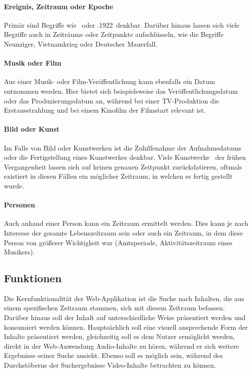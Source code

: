 \paragraph{Ereignis, Zeitraum oder Epoche}
Primär sind Begriffe wie \zB {}\grqq \ oder .1922\grqq \ denkbar. Darüber hinaus lassen sich viele Begriffe auch in Zeiträume oder Zeitpunkte aufschlüsseln, wie \zB die Begriffe \glqq Neunziger\grqq , \glqq Vietnamkrieg \grqq oder \glqq Deutscher Mauerfall\grqq . 

\paragraph{Musik oder Film}
Aus einer Musik- oder Film-Veröffentlichung kann ebenfalls ein Datum entnommen werden. Hier bietet sich beispielsweise das Veröffentlichungsdatum oder das Produzierungsdatum an, während bei einer TV-Produktion die Erstausstrahlung und bei einem Kinofilm der Filmstart relevant ist.

\paragraph{Bild oder Kunst}
Im Falle von Bild oder Kunstwerken ist die Zuhilfenahme der Aufnahmedatums oder die Fertigstellung eines Kunstwerkes denkbar. Viele Kunstwerke \oae \ der frühen Vergangenheit lassen sich auf keinen genauen Zeitpunkt zurückdatieren, oftmals existiert in diesen Fällen ein möglicher Zeitraum, in welchen es fertig gestellt wurde.

\paragraph{Personen}
Auch anhand einer Person kann ein Zeitraum ermittelt werden. Dies kann je nach Interesse der gesamte Lebenszeitraum sein oder auch ein Zeitraum, in dem diese Person von größerer Wichtigkeit war (Amtsperiode, Aktivitätszeitraum eines Musikers).

\subsection{Funktionen}
Die Kernfunktionalität der Web-Applikation ist die Suche nach Inhalten, die aus einem spezifischen Zeitraum stammen, \bzw sich mit diesem Zeitraum befassen. Darüber hinaus soll der Inhalt auf unterschiedliche Weise präsentiert werden und konsumiert werden können. Hauptsächlich soll eine visuell ansprechende Form der Inhalte präsentiert werden, gleichzeitig soll es dem Nutzer ermöglicht werden, direkt in der Web-Anwendung Audio-Inhalte zu hören, während er sich weitere Ergebnisse seiner Suche ansieht. Ebenso soll es möglich sein, während des Durchstöberns der Suchergebnisse Video-Inhalte betrachten zu können.

